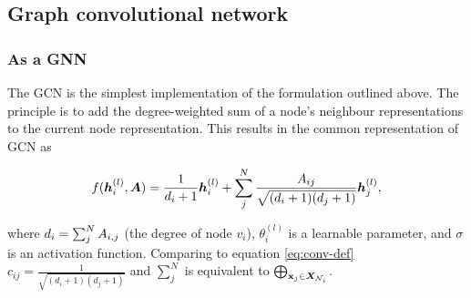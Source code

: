 





\subsection{Graph convolutional network}
\label{sec:GCN}



\subsubsection{As a GNN}

The GCN is the simplest implementation of the formulation outlined above.
The principle is to add the degree-weighted sum of a node's neighbour representations to the current node representation.
This results in the common representation of GCN as

\begin{equation}
    \label{eq:GCN-as-GNN}
    f({\bm{h}}_i^{(l)}, {\bm{A}}) = \frac1{d_i + 1}{\bm{h}}_i^{(l)} + \sum_j^N\frac{{A}_{ij}}{\sqrt{(d_i + 1)(d_j + 1)}}{\bm{h}}_j^{(l)},
\end{equation}

where $d_i = \sum_j^N {A}_{i,j}$ (the degree of node $v_i$), $\theta_i^{(l)}$ is a learnable parameter, and $\sigma$ is an activation function. Comparing to equation \ref{eq:conv-def} $c_{ij} = \frac1{\sqrt{(d_i + 1)(d_j + 1)}}$ and $\sum_j^N$ is equivalent to $\bigoplus_{{\textbf{x}}_j \in {\bm{X}}_{{\mathcal{N}}_i}}$. 

